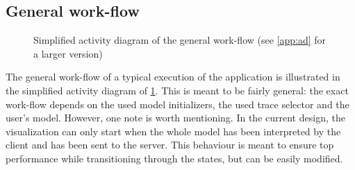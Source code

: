 \documentclass[a4paper]{article}
\begin{document}
\subsection{General work-flow}
\begin{figure}[ht]
  \centering
  \caption{Simplified activity diagram of the general work-flow (see \cref{app:ad} for a larger version)}
  \label{fig:ad_generalworkflow}
\end{figure}
The general work-flow of a typical execution of the application is illustrated in the simplified activity diagram of \cref{fig:ad_generalworkflow}. This is meant to be fairly general: the exact work-flow depends on the used model initializers, the used trace selector and the user's model. However, one note is worth mentioning. In the current design, the visualization can only start when the whole model has been interpreted by the client and has been sent to the server. This behaviour is meant to ensure top performance while transitioning through the states, but can be easily modified. 


\end{document}
